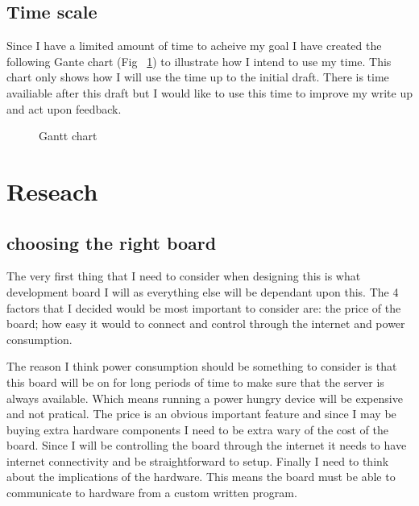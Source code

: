 \documentclass{article}
\begin{document}
\subsection{Time scale}

Since I have a limited amount of time to acheive my goal I have created the following Gante
chart (Fig ~\ref{fig:Gantt Chart}) to illustrate how I intend to use my time. This chart
only shows how I will use the time up to the initial draft. There is time availiable after
this draft but I would like to use this time to improve my write up and act upon feedback.

\begin{figure}
    \begin{gantt}[xunitlength=\textwidth / 16]{7}{16}
        \begin{ganttitle}
        \end{ganttitle}
        \begin{ganttitle}
        \end{ganttitle}
    \end{gantt}
    \caption{Gantt chart} \label{fig:Gantt Chart}
\end{figure}

\break
\section{Reseach}
\subsection{choosing the right board}

The very first thing that I need to consider when designing this is what development board
I will as everything else will be dependant upon this. The 4 factors that I decided would
be most important to consider are: the price of the board; how easy it would to connect
and control through the internet and power consumption.

The reason I think power consumption should be something to consider is that this board will
be on for long periods of time to make sure that the server is always available. Which means
running a power hungry device will be expensive and not pratical. The price is an obvious
important feature and since I may be buying extra hardware components I need to be extra wary of
the cost of the board. Since I will be controlling the board through the internet it needs to
have internet connectivity and be straightforward to setup. Finally I need to think about the
implications of the hardware. This means the board must be able to communicate to hardware from
a custom written program.
\end{document}
